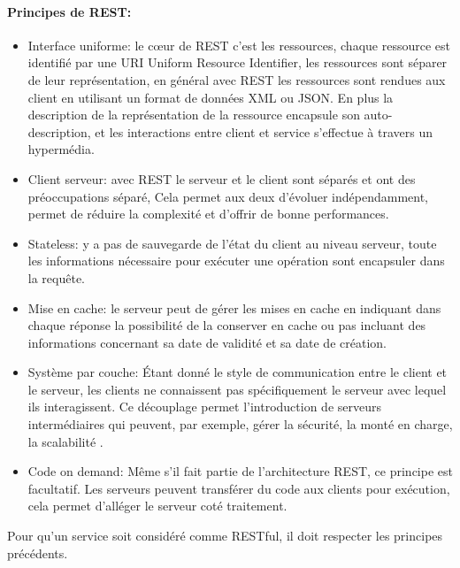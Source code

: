 \documentclass[12pt, a4paper, openany]{report}
\begin{document}
\begin{appendices}
  \paragraph{Principes de REST:}
  \begin{itemize}
    \item Interface uniforme: le cœur de REST c'est les ressources, chaque ressource est identifié par une URI Uniform Resource Identifier, les ressources sont séparer de leur représentation, en général avec REST les ressources sont rendues aux client en utilisant un format de données XML ou JSON. En plus la description de la représentation de la ressource encapsule son auto-description, et les interactions entre client et service s'effectue à travers un hypermédia.
    \item Client serveur: avec REST le serveur et le client sont séparés et ont des préoccupations séparé, Cela permet aux deux d'évoluer indépendamment, permet de réduire la complexité et d'offrir de bonne performances. 
    
    \item Stateless: y a pas de sauvegarde de l’état du client au niveau serveur, toute les informations nécessaire pour exécuter une opération sont encapsuler dans la requête.
    
    \item Mise en cache: le serveur peut de gérer les mises en cache en indiquant dans chaque réponse la possibilité de la conserver en cache ou pas incluant des informations concernant sa date de validité et sa date de création. 
      
    \item Système par couche: Étant donné le style de communication entre le client et le serveur, les clients ne connaissent pas spécifiquement le serveur  avec lequel ils interagissent. Ce découplage permet l'introduction de serveurs intermédiaires qui peuvent, par exemple, gérer la sécurité, la monté en charge, la scalabilité .
    
    \item Code on demand: Même s'il fait partie de l'architecture REST, ce principe est facultatif. Les serveurs peuvent transférer du code aux clients pour exécution, cela permet d’alléger le serveur coté traitement.

  \end{itemize}
  
  Pour qu'un service soit considéré comme RESTful, il doit respecter les principes précédents.

\end{appendices}
 


    
\end{document}
